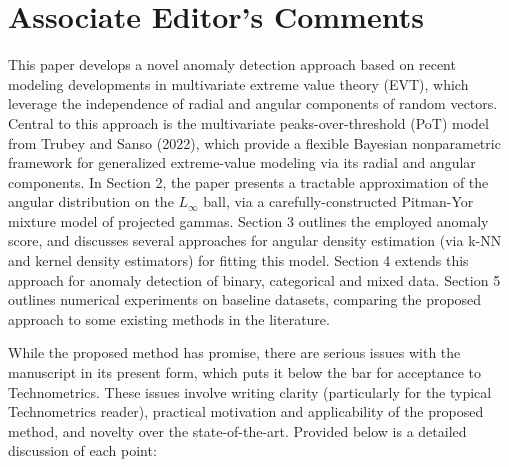 \documentclass{article}
\begin{document}
\section{Associate Editor's Comments}
This paper develops a novel anomaly detection approach based on recent modeling developments in 
    multivariate extreme value theory (EVT), which leverage the independence of radial and angular 
    components of random vectors. Central to this approach is the multivariate peaks-over-threshold 
    (PoT) model from Trubey and Sanso (2022), which provide a flexible Bayesian nonparametric 
    framework for generalized extreme-value modeling via its radial and angular components. In 
    Section 2, the paper presents a tractable approximation of the angular distribution on the 
    $L_\infty$ ball, via a carefully-constructed Pitman-Yor mixture model of projected gammas. 
    Section 3 outlines the employed anomaly score, and discusses several approaches for angular 
    density estimation (via k-NN and kernel density estimators) for fitting this model. Section 4 
    extends this approach for anomaly detection of binary, categorical and mixed data. Section 5 
    outlines numerical experiments on baseline datasets, comparing the proposed approach to some 
    existing methods in the literature.

While the proposed method has promise, there are serious issues with the manuscript in its present
    form, which puts it below the bar for acceptance to Technometrics. These issues involve writing 
    clarity (particularly for the typical Technometrics reader), practical motivation and 
    applicability of the proposed method, and novelty over the state-of-the-art. Provided below 
    is a detailed discussion of each point:
\end{document}
